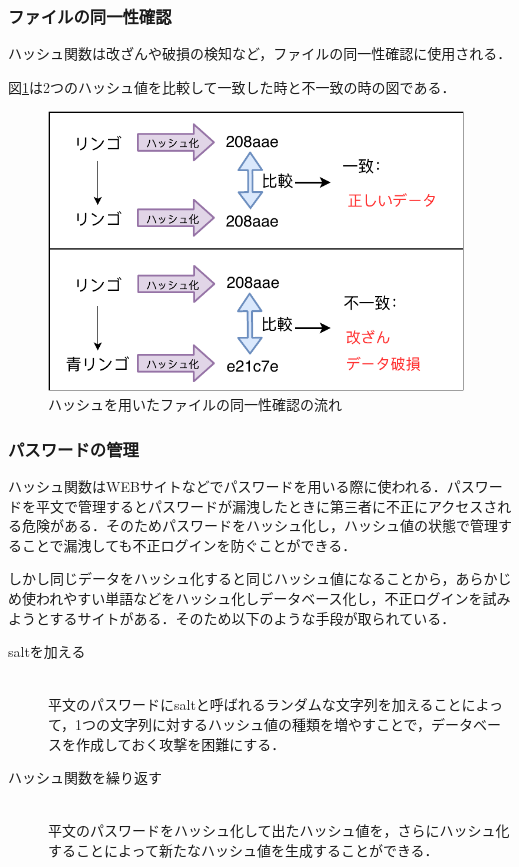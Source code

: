 \documentclass[a4j,12pt]{jsarticle}
\begin{document}
\subsubsection{ファイルの同一性確認}


ハッシュ関数は改ざんや破損の検知など，ファイルの同一性確認に使用される．

図\ref{fig:hash1}は2つのハッシュ値を比較して一致した時と不一致の時の図である．

\begin{figure}[H]
\centering
\includegraphics[width=11cm]{hash.pdf}
\caption{ハッシュを用いたファイルの同一性確認の流れ}
\label{fig:hash1}
\end{figure} 

\subsubsection{パスワードの管理}
ハッシュ関数はWEBサイトなどでパスワードを用いる際に使われる．パスワードを平文で管理するとパスワードが漏洩したときに第三者に不正にアクセスされる危険がある．そのためパスワードをハッシュ化し，ハッシュ値の状態で管理することで漏洩しても不正ログインを防ぐことができる．

しかし同じデータをハッシュ化すると同じハッシュ値になることから，あらかじめ使われやすい単語などをハッシュ化しデータベース化し，不正ログインを試みようとするサイトがある．そのため以下のような手段が取られている．

\begin{description}
\item[saltを加える]\ \\
平文のパスワードにsaltと呼ばれるランダムな文字列を加えることによって，1つの文字列に対するハッシュ値の種類を増やすことで，データベースを作成しておく攻撃を困難にする．

\item[ハッシュ関数を繰り返す]\ \\ 
平文のパスワードをハッシュ化して出たハッシュ値を，さらにハッシュ化することによって新たなハッシュ値を生成することができる．

\end{description}
\end{document}
